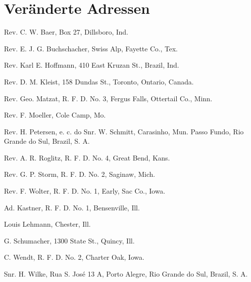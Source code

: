 \chapter{Veränderte Adressen}

Rev. C. W. Baer, Box 27, Dillsboro, Ind.

Rev. E. J. G. Buchschacher, Swiss Alp, Fayette Co., Tex.

Rev. Karl E. Hoffmann, 410 East Kruzan St., Brazil, Ind.

Rev. D. M. Kleist, 158 Dundas St., Toronto, Ontario, Canada.

Rev. Geo. Matzat, R. F. D. No. 3, Fergus Falls, Ottertail Co., Minn.

Rev. F. Moeller, Cole Camp, Mo.

Rev. H. Petersen, e. c. do Snr. W. Schmitt, Carasinho, Mun. Passo Fundo, Rio Grande do Sul, Brazil, S. A.

Rev. A. R. Roglitz, R. F. D. No. 4, Great Bend, Kans.

Rev. G. P. Storm, R. F. D. No. 2, Saginaw, Mich.

Rev. F. Wolter, R. F. D. No. 1, Early, Sac Co., Iowa.

Ad. Kastner, R. F. D. No. 1, Bensenville, Ill.

Louis Lehmann, Chester, Ill.

G. Schumacher, 1300 State St., Quincy, Ill.

C. Wendt, R. F. D. No. 2, Charter Oak, Iowa.

Snr. H. Wilke, Rua S. José 13 A, Porto Alegre, Rio Grande do Sul, Brazil, S. A.
